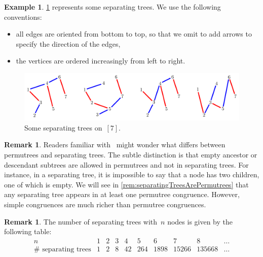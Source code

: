 \documentclass{amsart}
\theoremstyle{definition}
\newtheorem{example}[theorem]{Example}
\newtheorem{remark}[theorem]{Remark}
\begin{document}
\begin{example}
\label{exm:separatingTrees}
\cref{fig:separatingTrees} represents some separating trees. We use the following conventions:
\begin{itemize}
\item all edges are oriented from bottom to top, so that we omit to add arrows to specify the direction of the edges,
\item the vertices are ordered increasingly from left to right.
\end{itemize}
%
\begin{figure}[h]
	\capstart
	\centerline{\includegraphics[scale=.85]{figures/separatingTrees}}
	\caption{Some separating trees on~$[7]$.}
	\label{fig:separatingTrees}
\end{figure}
%
\end{example}

\begin{remark}
\label{rem:separatingTreesVSPermutrees}
Readers familiar with~\cite{PilaudPons-permutrees} might wonder what differs between permutrees and separating trees.
The subtle distinction is that empty ancestor or descendant subtrees are allowed in permutrees and not in separating trees.
For instance, in a separating tree, it is impossible to say that a node has two children, one of which is empty.
We will see in \cref{rem:separatingTreesArePermutrees} that any separating tree appears in at least one permutree congruence.
However, simple congruences are much richer than permutree congruences.
\end{remark}

\begin{remark}
The number of separating trees with~$n$ nodes is given by the following table:
\[
\begin{array}{c|ccccccccc}
n & 1 & 2 & 3 & 4 & 5 & 6 & 7 & 8 & \dots \\
\hline
\#\text{ separating trees} & 1 & 2 & 8 & 42 & 264 & 1898 & 15266 & 135668 & \dots
\end{array}
\]
\end{remark}
\end{document}
